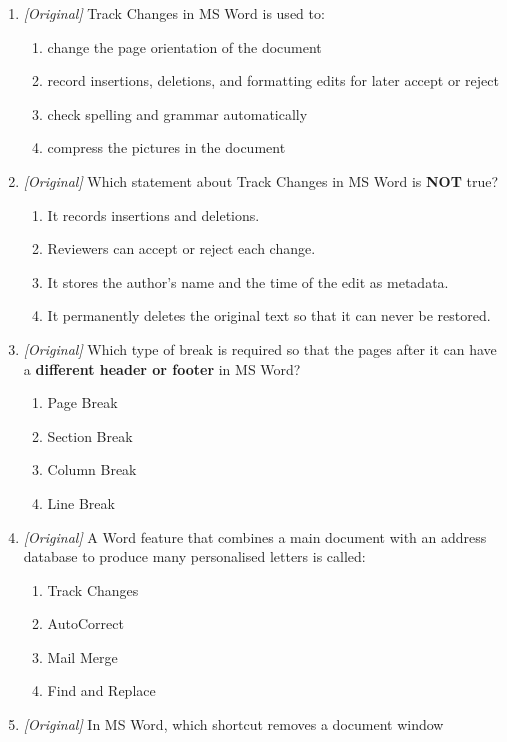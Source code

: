 \begin{enumerate}[label=\textbf{Q\arabic*.}, leftmargin=*]
\item \textit{[Original]} Track Changes in MS Word is used to:
  \begin{enumerate}[label=\Alph*.]
    \item change the page orientation of the document
    \item record insertions, deletions, and formatting edits for later
      accept or reject
    \item check spelling and grammar automatically
    \item compress the pictures in the document
  \end{enumerate}
\item \textit{[Original]} Which statement about Track Changes in MS Word is
  \textbf{NOT} true?
  \begin{enumerate}[label=\Alph*.]
    \item It records insertions and deletions.
    \item Reviewers can accept or reject each change.
    \item It stores the author's name and the time of the edit as metadata.
    \item It permanently deletes the original text so that it can never be
      restored.
  \end{enumerate}
\item \textit{[Original]} Which type of break is required so that the pages
  after it can have a \textbf{different header or footer} in MS Word?
  \begin{enumerate}[label=\Alph*.]
    \item Page Break
    \item Section Break
    \item Column Break
    \item Line Break
  \end{enumerate}
\item \textit{[Original]} A Word feature that combines a main document with
  an address database to produce many personalised letters is called:
  \begin{enumerate}[label=\Alph*.]
    \item Track Changes
    \item AutoCorrect
    \item Mail Merge
    \item Find and Replace
  \end{enumerate}
\item \textit{[Original]} In MS Word, which shortcut removes a document window

\end{enumerate}
